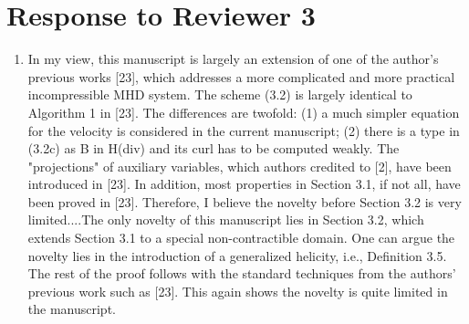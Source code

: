 \documentclass{article}
\theoremstyle{definition}
\newcommand{\rv}[1]{%
  \colorbox{gray!20}{%
    \parbox{0.96\linewidth}{%
      \small #1
    }%
  }%
}
\begin{document}
\section{Response to Reviewer 3}

\begin{enumerate}
    \item \rv{ In my view, this manuscript is largely an extension of one of the author's previous works [23], which addresses a more complicated and more practical incompressible MHD system. The scheme (3.2) is largely identical to Algorithm 1 in [23]. The differences are twofold: (1) a much simpler equation for the velocity is considered in the current manuscript; (2) there is a type in (3.2c) as B in H(div) and its curl has to be computed weakly. The "projections" of auxiliary variables, which authors credited to [2], have been introduced in [23]. In addition, most properties in Section 3.1, if not all, have been proved in [23]. Therefore, I believe the novelty before Section 3.2 is very limited....The only novelty of this manuscript lies in Section 3.2, which extends Section 3.1 to a special non-contractible domain. One can argue the novelty lies in the introduction of a generalized helicity, i.e., Definition 3.5. The rest of the proof follows with the standard techniques from the authors' previous work such as [23]. This again shows the novelty is quite limited in the manuscript.}


\end{enumerate}
\end{document}
